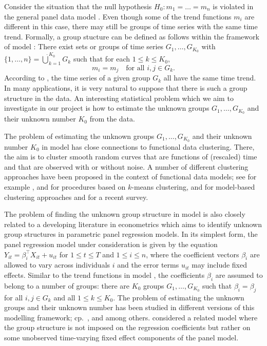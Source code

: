 \documentclass[a4paper,12pt]{article}
\makeatletter
\renewcommand{\eqref}[1]{\tagform@{\ref{#1}}}
\makeatother
\begin{document}
\noindent Consider the situation that the null hypothesis $H_0: m_1 = \ldots = m_n$ is violated in the general panel data model \eqref{eq:model}. Even though some of the trend functions $m_i$ are different in this case, there may still be groups of time series with the same time trend. Formally, a group stucture can be defined as follows within the framework of model \eqref{eq:model}: There exist sets or groups of time series $G_1,\ldots,G_{K_0}$ with $\{1,\ldots,n\} = \dot\bigcup_{k=1}^{K_0} G_k$ such that for each $1 \le k \le K_0$, 
\begin{equation}\label{eq:model:groups}
m_i = m_j \quad \text{for all } i,j \in G_k. 
\end{equation}
According to \eqref{eq:model:groups}, the time series of a given group $G_k$ all have the same time trend. In many applications, it is very natural to suppose that there is such a group structure in the data. An interesting statistical problem which we aim to investigate in our project is how to estimate the unknown groups $G_1,\ldots,G_{K_0}$ and their unknown number $K_0$ from the data. 


The problem of estimating the unknown groups $G_1,\ldots,G_{K_0}$ and their unknown number $K_0$ in model \eqref{eq:model} has close connections to functional data clustering. There, the aim is to cluster smooth random curves that are functions of (rescaled) time and that are observed with or without noise. A number of different clustering approaches have been proposed in the context of functional data models; see for example \cite{Abraham2003}, \cite{Tarpey2003} and \cite{Tarpey2007} for procedures based on $k$-means clustering, \cite{James2003} and \cite{Chiou2007} for model-based clustering approaches and \cite{Jacques2014} for a recent survey. 


The problem of finding the unknown group structure in model \eqref{eq:model} is also closely related to a developing literature in econometrics which aims to identify unknown group structures in parametric panel regression models. In its simplest form, the panel regression model under consideration is given by the equation $Y_{it} = \beta_i^\top X_{it} + u_{it}$ for $1 \le t \le T$ and $1 \le i \le n$, where the coefficient vectors $\beta_i$ are allowed to vary across individuals $i$ and the error terms $u_{it}$ may include fixed effects. Similar to the trend functions in model \eqref{eq:model}, the coefficients $\beta_i$ are assumed to belong to a number of groups: there are $K_0$ groups $G_1,\ldots,G_{K_0}$ such that $\beta_i = \beta_j$ for all $i,j \in G_k$ and all $1\le k \le K_0$. The problem of estimating the unknown groups and their unknown number has been studied in different versions of this modelling framework; cp.\ \cite{Su2016}, \cite{Su2018} and \cite{Wang2018} among others. \cite{Bonhomme2015} considered a related model where the group structure is not imposed on the regression coefficients but rather on some unobserved time-varying fixed effect components of the panel model. 
\end{document}
